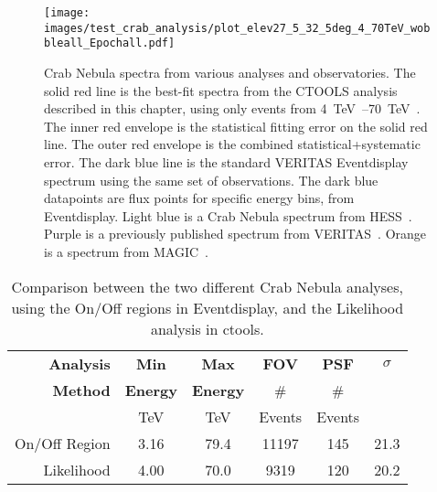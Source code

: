   \begin{figure}[!t]
    \centering
    \texttt{[image: images/test\_crab\_analysis/plot\_elev27\_5\_32\_5deg\_4\_70TeV\_wobbleall\_Epochall.pdf]}
    \caption[Crab Nebula Test Spectrum]
    {
      Crab Nebula spectra from various analyses and observatories.
      The solid red line is the best-fit spectra from the CTOOLS analysis described in this chapter, using only events from \SIrange{4}{70}{\TeV{}}.
      The inner red envelope is the statistical fitting error on the solid red line.
      The outer red envelope is the combined statistical+systematic error.
      The dark blue line is the standard VERITAS Eventdisplay spectrum using the same set of observations.
      The dark blue datapoints are flux points for specific energy bins, from Eventdisplay.
      Light blue is a Crab Nebula spectrum from HESS~\cite{hess2006crab}.
      Purple is a previously published spectrum from VERITAS~\cite{veritas2015crab}.
      Orange is a spectrum from MAGIC~\cite{magic2015crab}.
    }
    \label{fig:crab_test_spectra}
  \end{figure}
    
  \begin{table}[!t]
    \centering
    \begin{tabular}{|r|c|c|c|c|c|}
      \hline
      \textbf{Analysis} & \textbf{Min}    & \textbf{Max}    & \textbf{FOV} & \textbf{PSF} & \textbf{$\sigma$} \\
      \textbf{Method}   & \textbf{Energy} & \textbf{Energy} &  \#          & \#           &                   \\
                        & TeV             & TeV             &  Events      & Events       &                   \\
      \hline 
      On/Off Region & 3.16 & 79.4 & 11197 & 145 & 21.3 \\
      Likelihood    & 4.00 & 70.0 & 9319  & 120 & 20.2 \\
      \hline 
    \end{tabular}
    \caption[Analysis Comparison]{
      Comparison between the two different Crab Nebula analyses, using the On/Off regions in Eventdisplay, and the Likelihood analysis in ctools.
    }
    \label{tab:crab_statistics}
  \end{table}

